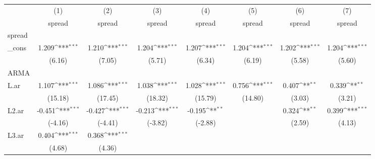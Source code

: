 {
\def\sym#1{\ifmmode^{#1}\else\(^{#1}\)\fi}
\begin{tabular}{l*{7}{c}}
\hline\hline
            &\multicolumn{1}{c}{(1)}&\multicolumn{1}{c}{(2)}&\multicolumn{1}{c}{(3)}&\multicolumn{1}{c}{(4)}&\multicolumn{1}{c}{(5)}&\multicolumn{1}{c}{(6)}&\multicolumn{1}{c}{(7)}\\
            &\multicolumn{1}{c}{spread}&\multicolumn{1}{c}{spread}&\multicolumn{1}{c}{spread}&\multicolumn{1}{c}{spread}&\multicolumn{1}{c}{spread}&\multicolumn{1}{c}{spread}&\multicolumn{1}{c}{spread}\\
\hline
spread      &                     &                     &                     &                     &                     &                     &                     \\
\_cons      &       1.209\sym{***}&       1.210\sym{***}&       1.204\sym{***}&       1.207\sym{***}&       1.204\sym{***}&       1.202\sym{***}&       1.204\sym{***}\\
            &      (6.16)         &      (7.05)         &      (5.71)         &      (6.34)         &      (6.19)         &      (5.58)         &      (5.60)         \\
\hline
ARMA        &                     &                     &                     &                     &                     &                     &                     \\
L.ar        &       1.107\sym{***}&       1.086\sym{***}&       1.038\sym{***}&       1.028\sym{***}&       0.756\sym{***}&       0.407\sym{**} &       0.339\sym{**} \\
            &     (15.18)         &     (17.45)         &     (18.32)         &     (15.79)         &     (14.80)         &      (3.03)         &      (3.21)         \\
[1em]
L2.ar       &      -0.451\sym{***}&      -0.427\sym{***}&      -0.213\sym{***}&      -0.195\sym{**} &                     &       0.324\sym{**} &       0.399\sym{***}\\
            &     (-4.16)         &     (-4.41)         &     (-3.82)         &     (-2.88)         &                     &      (2.59)         &      (4.13)         \\
[1em]
L3.ar       &       0.404\sym{***}&       0.368\sym{***}&                     &                     &                     &                     &                     \\
            &      (4.68)         &      (4.36)         &                     &                     &                     &                     &                     \\

\end{tabular}}
